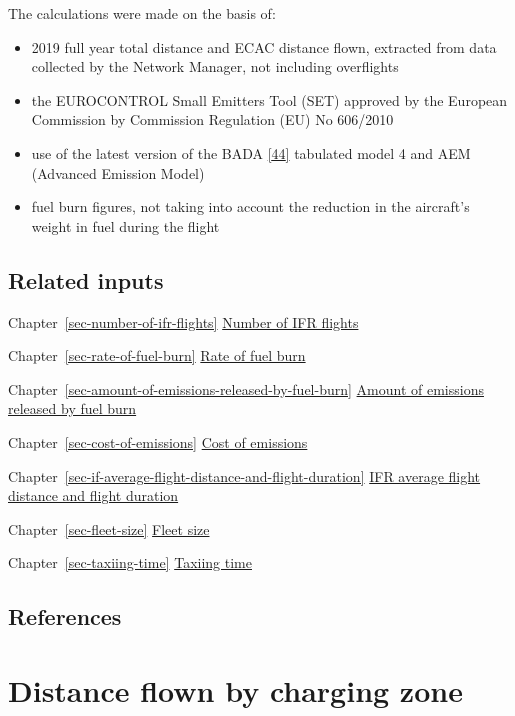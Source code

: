 \documentclass[
  11pt,
  a4paper,
]{book}
\begin{document}
The calculations were made on the basis of:

\begin{itemize}
\item
  2019 full year total distance and ECAC distance flown, extracted from
  data collected by the Network Manager, not including overflights
\item
  the EUROCONTROL Small Emitters Tool (SET) approved by the European
  Commission by Commission Regulation (EU) No 606/2010
\item
  use of the latest version of the BADA
  \protect\hyperlink{ref-ectl:bada}{{[}44{]}} tabulated model 4 and AEM
  (Advanced Emission Model)
\item
  fuel burn figures, not taking into account the reduction in the
  aircraft's weight in fuel during the flight
\end{itemize}

\hypertarget{related-inputs-15}{%
\section{Related inputs}\label{related-inputs-15}}

Chapter~\ref{sec-number-of-ifr-flights}
\protect\hyperlink{sec-number-of-ifr-flights}{Number of IFR flights}

Chapter~\ref{sec-rate-of-fuel-burn}
\protect\hyperlink{sec-rate-of-fuel-burn}{Rate of fuel burn}

Chapter~\ref{sec-amount-of-emissions-released-by-fuel-burn}
\protect\hyperlink{sec-amount-of-emissions-released-by-fuel-burn}{Amount
of emissions released by fuel burn}

Chapter~\ref{sec-cost-of-emissions}
\protect\hyperlink{sec-cost-of-emissions}{Cost of emissions}

Chapter~\ref{sec-if-average-flight-distance-and-flight-duration}
\protect\hyperlink{sec-if-average-flight-distance-and-flight-duration}{IFR
average flight distance and flight duration}

Chapter~\ref{sec-fleet-size} \protect\hyperlink{sec-fleet-size}{Fleet
size}

Chapter~\ref{sec-taxiing-time}
\protect\hyperlink{sec-taxiing-time}{Taxiing time}

\hypertarget{references-19}{%
\section{References}\label{references-19}}

\hypertarget{sec-distance-flown-by-charging-zone}{%
\chapter{Distance flown by charging
zone}\label{sec-distance-flown-by-charging-zone}}
\end{document}
